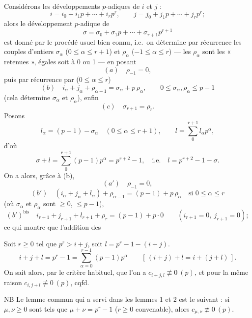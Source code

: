 \documentclass[11pt,a4paper]{article}
\begin{document}
 Considérons les développements $p$-adiques de $i$ et $j$ :
\[
  i = i_0 + i_1 p + \cdots + i_r p^r , \qquad j = j_0 + j_1 p + \cdots + j_r p^r ;
\]
alors le développement $p$-adique de \struck{\ill{}} 
\[
  \sigma = \sigma_0 + \sigma_1 p + \cdots + \sigma_{r+1} p^{r+1}
\]
est donné par le procédé usuel bien connu, i.e.\ on détermine par récurrence les couples
d'entiers \struck{\ill{}} $\sigma_\alpha$ ($0 \leq \alpha \leq r+1$) et $\rho_\alpha$
($-1 \leq \alpha \leq r$) — les $\rho_\alpha$ sont les « retenues », égales soit à 0 ou 1 —
en posant
\[
  (a) \quad \rho_{-1} = 0 ,
\]
puis par récurrence par ($0 \leq \alpha \leq r$)
\[
  (b) \quad i_\alpha + j_\alpha + \rho_{\alpha - 1} = \sigma_\alpha + p\, \rho_\alpha ,
  \qquad 0 \leq \sigma_\alpha, \rho_\alpha \leq p - 1
\]
(cela détermine $\sigma_\alpha$ et $\rho_\alpha$), enfin
\[
  (c) \quad \sigma_{r+1} = \rho_r .
\]
Posons
\[
  l_\alpha = (p-1) - \sigma_\alpha \quad (0 \leq \alpha \leq r+1) ,
  \qquad l = \sum_0^{r+1} l_\alpha p^\alpha ,
\]
d'où
\[
  \sigma + l = \sum_0^{r+1} (p-1) p^\alpha = p^{r+2} - 1 ,
  \quad \text{i.e.} \quad l = p^{r+2} - 1 - \sigma .
\]
On a alors, grâce à (b),
\[
  (a') \quad \rho_{-1} = 0 ,
\]
\[
  (b') \quad (i_\alpha + j_\alpha + l_\alpha) + \rho_{\alpha-1} = (p-1) + p\, \rho_\alpha
  \quad \text{si } 0 \leq \alpha \leq r
\]
(où $\sigma_\alpha$ et $\rho_\alpha$ sont $\geq 0$, $\leq p-1$),
\[
  (b')^{\text{bis}} \quad i_{r+1} + j_{r+1} + l_{r+1} + \rho_r = (p-1) + p \cdot 0
  \qquad (i_{r+1} = 0,\ j_{r+1} = 0) ;
\]
 ce qui montre que \struck{\ill{}} l'addition des

Soit $r \geq 0$ tel que $p^r > i + j$, soit \struck{\ill{}} $l = p^r - 1 - (i+j)$.
 \ill{}
\[
  i + j + l = p^r - 1 = \sum_{\alpha=0}^{r-1} (p-1) p^\alpha
  \qquad [\,(i+j) + l = i + (j+l)\,] .
\]
On sait alors, par le critère habituel, que l'on a $c_{i+j, l} \not\equiv 0 \ (p)$, et pour la
même raison $c_{i, j+l} \not\equiv 0 \ (p)$, cqfd.

NB Le lemme commun qui a servi dans les lemmes 1 et 2 est le suivant : si $\mu, \nu \geq 0$
sont tels que $\mu + \nu = p^r - 1$ ($r \geq 0$ convenable), alors
$c_{\mu, \nu} \not\equiv 0 \ (p)$. 
\end{document}
